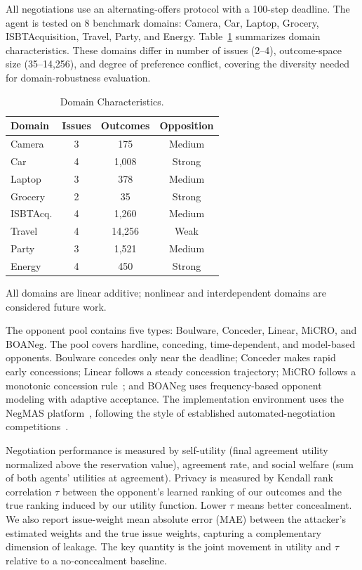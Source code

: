 \documentclass[runningheads]{llncs}
\begin{document}
All negotiations use an alternating-offers protocol with a 100-step deadline. The agent is tested on 8 benchmark domains: Camera, Car, Laptop, Grocery, ISBTAcquisition, Travel, Party, and Energy. Table~\ref{tab:domains} summarizes domain characteristics. These domains differ in number of issues (2--4), outcome-space size (35--14,256), and degree of preference conflict, covering the diversity needed for domain-robustness evaluation.

\begin{table}[t]
\centering
\caption{Domain Characteristics.}
\label{tab:domains}
\small
\renewcommand{\arraystretch}{1.15}
\begin{tabular}{lccc}
\toprule
\textbf{Domain} & \textbf{Issues} & \textbf{Outcomes} & \textbf{Opposition} \\
\midrule
Camera     & 3 & 175    & Medium \\
Car        & 4 & 1,008  & Strong \\
Laptop     & 3 & 378    & Medium \\
Grocery    & 2 & 35     & Strong \\
ISBTAcq.   & 4 & 1,260  & Medium \\
Travel     & 4 & 14,256 & Weak   \\
Party      & 3 & 1,521  & Medium \\
Energy     & 4 & 450    & Strong \\
\bottomrule
\end{tabular}
\end{table}

All domains are linear additive; nonlinear and interdependent domains are considered future work.

The opponent pool contains five types: Boulware, Conceder, Linear, MiCRO, and BOANeg. The pool covers hardline, conceding, time-dependent, and model-based opponents. Boulware concedes only near the deadline; Conceder makes rapid early concessions; Linear follows a steady concession trajectory; MiCRO follows a monotonic concession rule~\cite{micro_1}; and BOANeg uses frequency-based opponent modeling with adaptive acceptance. The implementation environment uses the NegMAS platform~\cite{Negmas}, following the style of established automated-negotiation competitions~\cite{Genius,anac2022}.

Negotiation performance is measured by self-utility (final agreement utility normalized above the reservation value), agreement rate, and social welfare (sum of both agents' utilities at agreement). Privacy is measured by Kendall rank correlation $\tau$ between the opponent's learned ranking of our outcomes and the true ranking induced by our utility function. Lower $\tau$ means better concealment. We also report issue-weight mean absolute error (MAE) between the attacker's estimated weights and the true issue weights, capturing a complementary dimension of leakage. The key quantity is the joint movement in utility and $\tau$ relative to a no-concealment baseline.
\end{document}
